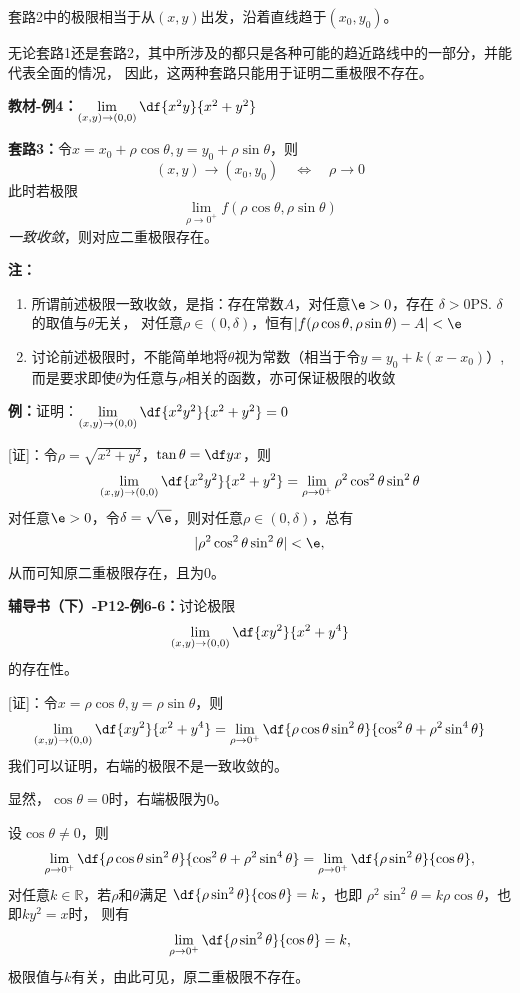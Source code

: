 套路2中的极限相当于从$(x,y)$出发，沿着直线趋于$(x_0,y_0)$。

无论套路1还是套路2，其中所涉及的都只是各种可能的趋近路线中的一部分，并能代表全面的情况，
因此，这两种套路只能用于证明二重极限不存在。

{\bf 教材-例4：}$\lim\limits_{(x,y)\to(0,0)}\df{x^2y}{x^2+y^2}$

{\bf 套路3：}令$x=x_0+\rho\cos\theta,y=y_0+\rho\sin\theta$，则
$$(x,y)\to(x_0,y_0)\quad\Leftrightarrow\quad\rho\to0$$
此时若极限
$$\lim\limits_{\rho\to{0^+}}f(\rho\cos\theta,\rho\sin\theta)$$
{\it 一致收敛}，则对应二重极限存在。

{\bf 注：}
\begin{enumerate}[(1)]
  \setlength{\itemindent}{1cm}
  \item 所谓前述极限一致收敛，是指：存在常数$A$，对任意$\e>0$，存在
  $\delta>0$\ps{$\delta$的取值与$\theta$无关}，
  对任意$\rho\in(0,\delta)$，恒有$|f(\rho\cos\theta,\rho\sin\theta)-A|<\e$
  \item 讨论前述极限时，不能简单地将$\theta$视为常数（相当于令$y=y_0+k(x-x_0)$）,
  而是要求即使$\theta$为任意与$\rho$相关的函数，亦可保证极限的收敛
\end{enumerate}

{\bf 例：}证明：$\lim\limits_{(x,y)\to(0,0)}\df{x^2y^2}{x^2+y^2}=0$
	
[证]：令$\rho=\sqrt{x^2+y^2}$，$\tan\theta=\df yx$，则	
$$\lim\limits_{(x,y)\to(0,0)}\df{x^2y^2}{x^2+y^2}
=\lim\limits_{\rho\to{0^+}}\rho^2\cos^2\theta\sin^2\theta$$
对任意$\e>0$，令$\delta=\sqrt{\e}$，则对任意$\rho\in(0,\delta)$，总有
$$|\rho^2\cos^2\theta\sin^2\theta|<\e,$$
从而可知原二重极限存在，且为$0$。

{\bf 辅导书（下）-P12-例6-6：}讨论极限
$$\lim\limits_{(x,y)\to(0,0)}\df{xy^2}{x^2+y^4}$$
的存在性。

[证]：令$x=\rho\cos\theta,y=\rho\sin\theta$，则
$$\lim\limits_{(x,y)\to(0,0)}\df{xy^2}{x^2+y^4}
=\lim\limits_{\rho\to0^+}\df{\rho\cos\theta\sin^2\theta}
{\cos^2\theta+\rho^2\sin^4\theta}$$
我们可以证明，右端的极限不是一致收敛的。

显然，$\cos\theta=0$时，右端极限为$0$。

设$\cos\theta\ne 0$，则
$$\lim\limits_{\rho\to0^+}\df{\rho\cos\theta\sin^2\theta}
{\cos^2\theta+\rho^2\sin^4\theta}
=\lim\limits_{\rho\to0^+}\df{\rho\sin^2\theta}{\cos\theta},$$
对任意$k\in\mathbb{R}，$若$\rho$和$\theta$满足
$\df{\rho\sin^2\theta}{\cos\theta}=k$，也即
$\rho^2\sin^2\theta=k\rho\cos\theta$，也即$ky^2=x$时，
则有
$$\lim\limits_{\rho\to0^+}\df{\rho\sin^2\theta}{\cos\theta}=k,$$
极限值与$k$有关，由此可见，原二重极限不存在。

